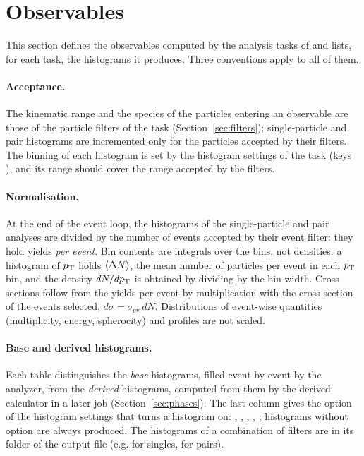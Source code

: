 \section{Observables}
\label{sec:observables}

This section defines the observables computed by the analysis tasks of \Datum{} and lists, for each task, the histograms
it produces. Three conventions apply to all of them.

\paragraph{Acceptance.}
The kinematic range and the species of the particles entering an observable are those of the particle filters of the
task (Section~\ref{sec:filters}); single-particle and pair histograms are incremented only for the particles accepted
by their filters. The binning of each histogram is set by the histogram settings of the task (keys
), and its range should cover the range accepted by the filters.

\paragraph{Normalisation.}
At the end of the event loop, the histograms of the single-particle and pair analyses are divided by the number of
events accepted by their event filter: they hold yields \emph{per event}. Bin contents are integrals over the bins, not
densities: a histogram of $p_{\mathrm{T}}$ holds $\left\langle \Delta N \right\rangle$, the mean number of particles per event in each $p_{\mathrm{T}}$ bin, and
the density $dN/dp_{\mathrm{T}}$ is obtained by dividing by the bin width. Cross sections follow from the yields per event by
multiplication with the cross section of the events selected, $d\sigma = \sigma_{\mathrm{ev}}\, dN$. Distributions of
event-wise quantities (multiplicity, energy, spherocity) and profiles are not scaled.

\paragraph{Base and derived histograms.}
Each table distinguishes the \emph{base} histograms, filled event by event by the analyzer, from the \emph{derived}
histograms, computed from them by the derived calculator in a later job (Section~\ref{sec:phases}). The last column
gives the option of the histogram settings that turns a histogram on: , ,
, , ; histograms without option are always produced. The histograms of a
combination of filters are in its folder of the output file (e.g.  for singles, 
for pairs).


